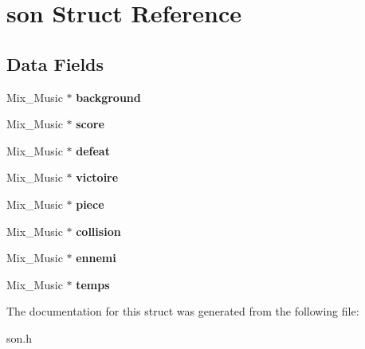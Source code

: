 \hypertarget{structson}{}\section{son Struct Reference}
\label{structson}
\subsection*{Data Fields}
\begin{DoxyCompactItemize}
\item 
Mix\+\_\+\+Music $\ast$ {\bfseries background}\hypertarget{structson_a6a25d5fa5e5e8d1afbc03a93d4460831}{}\label{structson_a6a25d5fa5e5e8d1afbc03a93d4460831}

\item 
Mix\+\_\+\+Music $\ast$ {\bfseries score}\hypertarget{structson_a2c10960974c6d823653a16654386905f}{}\label{structson_a2c10960974c6d823653a16654386905f}

\item 
Mix\+\_\+\+Music $\ast$ {\bfseries defeat}\hypertarget{structson_a774bb5eb471c01032bb87ec78bc3676a}{}\label{structson_a774bb5eb471c01032bb87ec78bc3676a}

\item 
Mix\+\_\+\+Music $\ast$ {\bfseries victoire}\hypertarget{structson_abd275370320e189029e6b91b097def02}{}\label{structson_abd275370320e189029e6b91b097def02}

\item 
Mix\+\_\+\+Music $\ast$ {\bfseries piece}\hypertarget{structson_ae8c05e212af9dfc13f89a6cc40f46ca2}{}\label{structson_ae8c05e212af9dfc13f89a6cc40f46ca2}

\item 
Mix\+\_\+\+Music $\ast$ {\bfseries collision}\hypertarget{structson_aab54c5e9dda7015866f4b05be73d82f6}{}\label{structson_aab54c5e9dda7015866f4b05be73d82f6}

\item 
Mix\+\_\+\+Music $\ast$ {\bfseries ennemi}\hypertarget{structson_a110f84dc77e6623f253adb2d858fa737}{}\label{structson_a110f84dc77e6623f253adb2d858fa737}

\item 
Mix\+\_\+\+Music $\ast$ {\bfseries temps}\hypertarget{structson_a131e40180bac9d625f432b6101da492a}{}\label{structson_a131e40180bac9d625f432b6101da492a}

\end{DoxyCompactItemize}


The documentation for this struct was generated from the following file\+:\begin{DoxyCompactItemize}
\item 
son.\+h\end{DoxyCompactItemize}
